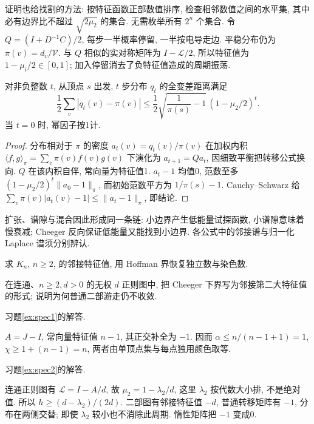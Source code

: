 证明也给找割的方法: 按特征函数正部数值排序, 检查相邻数值之间的水平集, 其中必有边界比不超过 $\sqrt{2\mu_2}$ 的集合. 无需枚举所有 $2^n$ 个集合.
令 $Q=(I+D^{-1}C)/2$, 每步一半概率停留, 一半按电导走边. 平稳分布仍为 $\pi(v)=d_v/\mathcal V$. 与 $Q$ 相似的实对称矩阵为 $I-\mathcal L/2$, 所以特征值为 $1-\mu_i/2\in[0,1]$; 加入停留消去了负特征值造成的周期振荡.
\begin{theorem}\label{thm:lazymix}
对非负整数 $t$, 从顶点 $s$ 出发, $t$ 步分布 $q_t$ 的全变差距离满足
\[
\frac12\sum_v|q_t(v)-\pi(v)|
\le\frac12\sqrt{\frac1{\pi(s)}-1}\,(1-\mu_2/2)^t.
\]
当 $t=0$ 时, 幂因子按1计.
\end{theorem}
\begin{proof}
分布相对于 $\pi$ 的密度 $a_t(v)=q_t(v)/\pi(v)$ 在加权内积 $\langle f,g\rangle_\pi=\sum_v\pi(v)f(v)g(v)$ 下演化为 $a_{t+1}=Qa_t$, 因细致平衡把转移公式换向. $Q$ 在该内积自伴, 常向量为特征值1. $a_t-1$ 均值0, 范数至多 $(1-\mu_2/2)^t\|a_0-1\|_\pi$, 而初始范数平方为 $1/\pi(s)-1$. Cauchy--Schwarz 给 $\sum_v\pi(v)|a_t(v)-1|\le\|a_t-1\|_\pi$, 即结论.
\end{proof}
扩张、谱隙与混合因此形成同一条链: 小边界产生低能量试探函数, 小谱隙意味着慢衰减; Cheeger 反向保证低能量又能找到小边界. 各公式中的邻接谱与归一化 Laplace 谱须分别辨认.
\begin{exercise}\label{ex:spec1}
求 $K_n$, $n\ge2$, 的邻接特征值, 用 Hoffman 界恢复独立数与染色数.
\end{exercise}
\begin{exercise}\label{ex:spec2}
在连通、$n\ge2,d>0$ 的无权 $d$ 正则图中, 把 Cheeger 下界写为邻接第二大特征值的形式; 说明为何普通二部游走仍不收敛.
\end{exercise}
习题\ref{ex:spec1}的解答.
\begin{solution}
$A=J-I$, 常向量特征值 $n-1$, 其正交补全为 $-1$. 因而 $\alpha\le n/(n-1+1)=1$, $\chi\ge1+(n-1)=n$, 两者由单顶点集与每点独用颜色取等.
\end{solution}
习题\ref{ex:spec2}的解答.
\begin{solution}
连通正则图有 $\mathcal L=I-A/d$, 故 $\mu_2=1-\lambda_2/d$, 这里 $\lambda_2$ 按代数大小排, 不是绝对值. 所以 $h\ge(d-\lambda_2)/(2d)$. 二部图有邻接特征值 $-d$, 普通转移矩阵有 $-1$, 分布在两侧交替; 即使 $\lambda_2$ 较小也不消除此周期. 惰性矩阵把 $-1$ 变成0.
\end{solution}
